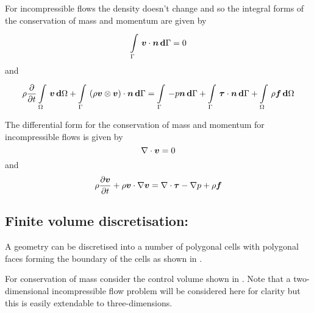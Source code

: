 For incompressible flows the density doesn't change and so the
integral forms of the conservation of mass and momentum are given by
\begin{equation}
    \displaystyle\int\limits_{\Gamma}^{} \,\boldsymbol{v}\cdot\boldsymbol{n}\, \boldsymbol{\mathrm{d}} \Gamma =0
\end{equation}
and
\begin{equation}
  \rho \dfrac{\partial }{\partial t}   \displaystyle\int\limits_{\Omega}^{} \,\boldsymbol{v}\, \boldsymbol{\mathrm{d}} \Omega +  \displaystyle\int\limits_{\Gamma}^{} \,\left(  \rho\boldsymbol{v} \otimes \boldsymbol{v}  \right)\cdot\boldsymbol{n}\, \boldsymbol{\mathrm{d}} \Gamma 
  =  \displaystyle\int\limits_{\Gamma}^{} \,-p\boldsymbol{n}\, \boldsymbol{\mathrm{d}} \Gamma +  \displaystyle\int\limits_{\Gamma}^{} \,\boldsymbol{\mathit{\tau}}\cdot\boldsymbol{n}\, \boldsymbol{\mathrm{d}} \Gamma 
  +  \displaystyle\int\limits_{\Omega}^{} \,\rho\boldsymbol{f}\, \boldsymbol{\mathrm{d}} \Omega 
\end{equation}

The differential form for the conservation of mass and momentum for
incompressible flows is given by
\begin{equation}
  \divergence{}{\vectr{v}}=0
\end{equation}
and
\begin{equation}
  \rho\delby{\vectr{v}}{t}+\dotprod{\rho\vectr{v}}{\gradient{}{\vectr{v}}}=\divergence{}{\tensor{\tau}}-\gradient{}{p}+\rho\vectr{f}
\end{equation}

\subsection{Finite volume discretisation:}

A geometry can be discretised into a number of polygonal cells with polygonal
faces forming the boundary of the cells as shown in .


For conservation of mass consider the control volume shown in
. Note that a two-dimensional incompressible flow problem will be
considered here for clarity but this is easily extendable to three-dimensions.


